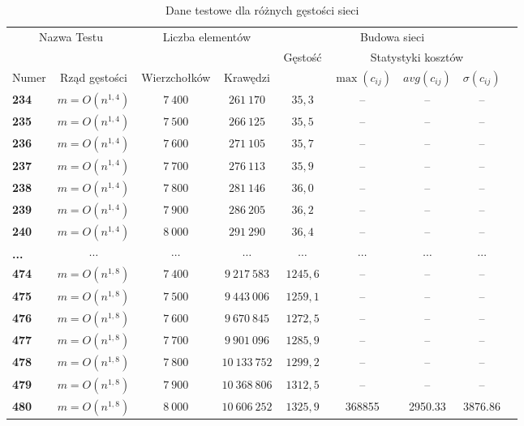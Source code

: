 \begin{table}[h]
\centering
\begin{tabular}{lcccccccc}
\hline
\multicolumn{2}{c|}{\multirow{2}{*}{Nazwa Testu}} & \multicolumn{2}{c|}{\multirow{2}{*}{Liczba elementów}} & \multicolumn{4}{c}{Budowa sieci} &  \\ \cline{5-9}
\multicolumn{2}{l|}{} & \multicolumn{2}{c|}{} & \multirow{2}{*}{Gęstość} & \multicolumn{3}{|c}{Statystyki kosztów} &  \\ \cline{1-4} \cline{6-9}
\multicolumn{1}{l|}{Numer} & \multicolumn{1}{c|}{Rząd gęstości} & \multicolumn{1}{c|}{Wierzchołków} & \multicolumn{1}{c|}{Krawędzi} & & \multicolumn{1}{|c}{$\max \left( c_{ij} \right) $} & \multicolumn{1}{|c}{$ avg \left( c_{ij} \right) $} & \multicolumn{1}{|c}{$\sigma \left( c_{ij} \right) $} &  \\
\hline
\textbf{234} & $ m = O \left( n^{1,4} \right) $ & $7~400$ & $261~170$ & $35,3$ & -- & -- & -- &  \\
\textbf{235} & $ m = O \left( n^{1,4} \right) $ & $7~500$ & $266~125$ & $35,5$ & -- & -- & -- &  \\
\textbf{236} & $ m = O \left( n^{1,4} \right) $ & $7~600$ & $271~105$ & $35,7$ & -- & -- & -- &  \\
\textbf{237} & $ m = O \left( n^{1,4} \right) $ & $7~700$ & $276~113$ & $35,9$ & -- & -- & -- &  \\
\textbf{238} & $ m = O \left( n^{1,4} \right) $ & $7~800$ & $281~146$ & $36,0$ & -- & -- & -- &  \\
\textbf{239} & $ m = O \left( n^{1,4} \right) $ & $7~900$ & $286~205$ & $36,2$ & -- & -- & -- &  \\
\textbf{240} & $ m = O \left( n^{1,4} \right) $ & $8~000$ & $291~290$ & $36,4$ & -- & -- & -- &  \\
\textbf{...} & $ \cdots $ & $ \cdots $ & $ \cdots $ & $ \cdots $ & $ \cdots $ & $ \cdots $ & $ \cdots $ &  \\
\textbf{474} & $ m = O \left( n^{1,8} \right) $ & $7~400$ & $9~217~583$ & $1245,6$ & -- & -- & -- &  \\
\textbf{475} & $ m = O \left( n^{1,8} \right) $ & $7~500$ & $9~443~006$ & $1259,1$ & -- & -- & -- &  \\
\textbf{476} & $ m = O \left( n^{1,8} \right) $ & $7~600$ & $9~670~845$ & $1272,5$ & -- & -- & -- &  \\
\textbf{477} & $ m = O \left( n^{1,8} \right) $ & $7~700$ & $9~901~096$ & $1285,9$ & -- & -- & -- &  \\
\textbf{478} & $ m = O \left( n^{1,8} \right) $ & $7~800$ & $10~133~752$ & $1299,2$ & -- & -- & -- &  \\
\textbf{479} & $ m = O \left( n^{1,8} \right) $ & $7~900$ & $10~368~806$ & $1312,5$ & -- & -- & -- &  \\
\textbf{480} & $ m = O \left( n^{1,8} \right) $ & $8~000$ & $10~606~252$ & $1325,9$ & 368855 & 2950.33 & 3876.86 &  \\
\hline
\end{tabular}
\caption{Dane testowe dla różnych gęstości sieci}
\label{tab:denceTest}
\end{table}

